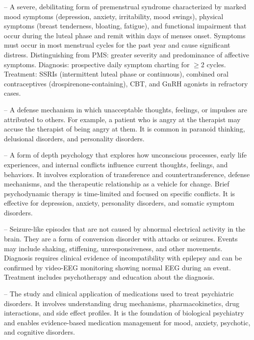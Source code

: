 -- A severe, debilitating form of premenstrual syndrome characterized by marked mood symptoms (depression, anxiety, irritability, mood swings), physical symptoms (breast tenderness, bloating, fatigue), and functional impairment that occur during the luteal phase and remit within days of menses onset. Symptoms must occur in most menstrual cycles for the past year and cause significant distress. Distinguishing from PMS: greater severity and predominance of affective symptoms. Diagnosis: prospective daily symptom charting for \(\ge\)2 cycles. Treatment: SSRIs (intermittent luteal phase or continuous), combined oral contraceptives (drospirenone-containing), CBT, and GnRH agonists in refractory cases.

-- A defense mechanism in which unacceptable thoughts, feelings, or impulses are attributed to others. For example, a patient who is angry at the therapist may accuse the therapist of being angry at them. It is common in paranoid thinking, delusional disorders, and personality disorders.

-- A form of depth psychology that explores how unconscious processes, early life experiences, and internal conflicts influence current thoughts, feelings, and behaviors. It involves exploration of transference and countertransference, defense mechanisms, and the therapeutic relationship as a vehicle for change. Brief psychodynamic therapy is time-limited and focused on specific conflicts. It is effective for depression, anxiety, personality disorders, and somatic symptom disorders.

-- Seizure-like episodes that are not caused by abnormal electrical activity in the brain. They are a form of conversion disorder with attacks or seizures. Events may include shaking, stiffening, unresponsiveness, and other movements. Diagnosis requires clinical evidence of incompatibility with epilepsy and can be confirmed by video-EEG monitoring showing normal EEG during an event. Treatment includes psychotherapy and education about the diagnosis.

-- The study and clinical application of medications used to treat psychiatric disorders. It involves understanding drug mechanisms, pharmacokinetics, drug interactions, and side effect profiles. It is the foundation of biological psychiatry and enables evidence-based medication management for mood, anxiety, psychotic, and cognitive disorders.

